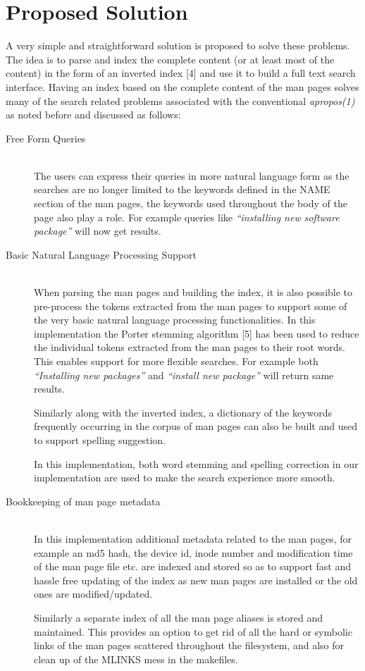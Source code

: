 \documentclass[titlepage, a4paper, 12pt]{article}
\begin{document}
\section{Proposed Solution}
A very simple and straightforward solution is proposed to solve these problems.
The idea is to parse and index
the complete content (or at least most of the content) in the form of an
inverted index [4] and use it to build a full text search
interface. Having an index based on the complete content of the man pages solves
many of the search
related problems associated with the conventional \textit{apropos(1)} as noted
before and discussed as follows:
\begin{description}
\item[Free Form Queries] \hfill \\
The users can express their queries in more natural language form as the searches
are no longer limited to the keywords defined in the NAME section of the man
pages, the keywords used throughout the body of the page also play a role.
For example queries like \textit{``installing new software package''}
will now get results.
\end{description}
\begin{description}
\item[Basic Natural Language Processing Support] \hfill \\
When parsing the man pages and building the index, it is also possible to
pre-process the tokens extracted from the man pages to support some of the very
basic natural language processing functionalities. In this implementation the
Porter stemming algorithm [5] has been used to
reduce the individual tokens extracted from the man pages to their root words.
This enables support for more flexible searches. For example both
\textit{``Installing new packages''} and \textit{``install new package''} will
return same results.

Similarly along with the inverted index, a dictionary of the keywords frequently
occurring in the corpus of man pages can also be built and used to support
spelling suggestion.

In this implementation, both word stemming and spelling correction in our implementation are used to make the search experience more smooth.
\end{description}
\begin{description}
\item[Bookkeeping of man page metadata] \hfill \\
In this implementation additional metadata related to the man pages, for example
an md5 hash, the device id, inode number and modification time
of the man page file etc. are indexed and stored so
as to support fast and hassle free updating of the index as new man pages are
installed or the old ones are modified/updated.

Similarly a separate index of all the man page aliases is stored and maintained.
This provides an option to get rid of all the hard or symbolic links of the man
pages scattered throughout the filesystem, and also for clean up of the MLINKS
mess in the makefiles.
\end{description}
\end{document}
